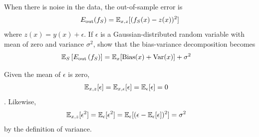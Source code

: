 \begin{problem}[5] When there is noise in the data, the out-of-sample error is
\begin{align}
	E_\text{out}(f_S)  = \mathbb{E}_{x,z}[(f_S(x) - z(x))^2]
\end{align}
where $z(x) = y(x) + \epsilon$.
If $\epsilon$ is a Gaussian-distributed random variable with mean of zero and variance $\sigma^2$, show that the bias-variance decomposition becomes
\begin{align}
	\mathbb{E}_S \left[E_\text{out}\left(f_S\right)\right] & = \mathbb{E}_x[\operatorname{Bias}(x) + \operatorname{Var}(x)] + \sigma^2
\end{align}
\begin{hint}
	Given the mean of $\epsilon$ is zero,
	\begin{align}
		\mathbb{E}_{x, z}[\epsilon] & = \mathbb{E}_{x, \epsilon}[\epsilon] = \mathbb{E}_\epsilon [\epsilon] = 0
	\end{align}.
	Likewise,
	\begin{align}
		\mathbb{E}_{x, z}[\epsilon^2] & = \mathbb{E}_\epsilon [\epsilon^2] = \mathbb{E}_\epsilon [(\epsilon- \mathbb{E}_\epsilon[\epsilon])^2] = \sigma^2
	\end{align} by the definition of variance.
\end{hint}
\end{problem}
\begin{solution}

\end{solution}


